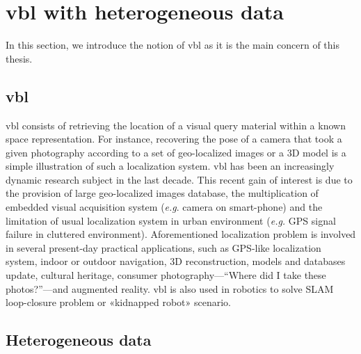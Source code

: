 \section{\Acl*{vbl} with heterogeneous data}

In this section, we introduce the notion of \ac{vbl} as it is the main concern of this thesis.

\subsection{\Acl*{vbl}}
	
	\Ac{vbl} consists of retrieving the location of a visual query material within a known space representation. For instance, recovering the pose of a camera that took a given photography according to a set of geo-localized images or a 3D model is a simple illustration of such a localization system. \ac{vbl} has been an increasingly dynamic research subject in the last decade. This recent gain of interest is due to the provision of large geo-localized images database, the multiplication of embedded visual acquisition system (\textit{e.g}. camera on smart-phone) and the limitation of usual localization system in urban environment (\textit{e.g.} GPS signal failure in cluttered environment). Aforementioned localization problem is involved in several present-day practical applications, such as GPS-like localization system, indoor or outdoor navigation, 3D reconstruction, models and databases update, cultural heritage, consumer photography---``Where did I take these photos?''---and augmented reality. \Ac{vbl} is also used in robotics to solve SLAM loop-closure problem or «kidnapped robot» scenario.
		
\subsection{Heterogeneous data}

	
	